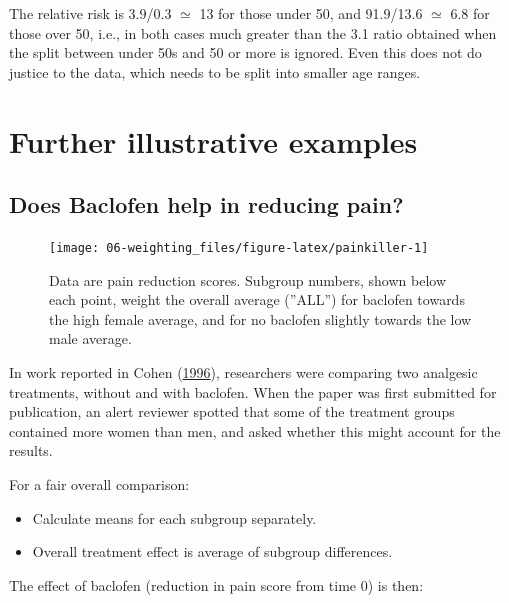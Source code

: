 \documentclass[
  10pt,
  b5paper]{book}
\providecommand{\tightlist}{%
  \setlength{\itemsep}{0pt}\setlength{\parskip}{0pt}}
\begin{document}
The relative risk is 3.9/0.3 \(\simeq\) 13 for those under 50, and 91.9/13.6 \(\simeq\) 6.8 for those over 50, i.e., in both cases much greater than the 3.1 ratio obtained when the split between under 50s and 50 or more is ignored. Even this does not do justice to the data, which needs to be split into smaller age ranges.

\hypertarget{further-illustrative-examples}{%
\section{Further illustrative examples}\label{further-illustrative-examples}}

\hypertarget{does-baclofen-help-in-reducing-pain}{%
\subsection*{Does Baclofen help in reducing pain?}\label{does-baclofen-help-in-reducing-pain}}

\begin{figure}[H]

{\centering \texttt{[image: 06-weighting\_files/figure-latex/painkiller-1]} 

}

\caption{Data are pain reduction scores. Subgroup numbers, shown
    below each point, weight the overall average (''ALL'') for
    baclofen towards the high female average, and for no baclofen
    slightly towards the low male average.}\label{fig:painkiller}
\end{figure}

In work reported in Cohen (\protect\hyperlink{ref-cohen1996}{1996}), researchers were comparing two analgesic treatments, without and with baclofen. When the paper was first submitted for publication, an alert reviewer spotted that some of the treatment groups contained more women than men, and asked whether this might account for the results.

For a fair overall comparison:

\begin{itemize}
\tightlist
\item
  Calculate means for each subgroup separately.
\item
  Overall treatment effect is average of subgroup differences.
\end{itemize}

The effect of baclofen (reduction in pain score from time 0) is then:
\end{document}
